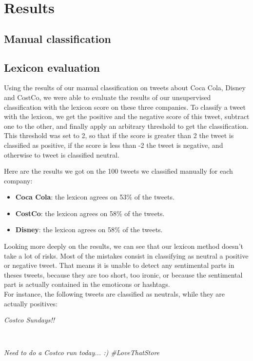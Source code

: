 \documentclass[a4paper,12pt]{report}
\begin{document}
\chapter{Results}

\section{Manual classification}



\section{Lexicon evaluation}

Using the results of our manual classification on tweets about Coca Cola, Disney and CostCo, we were able to evaluate the results of our unsupervised classification with the lexicon score on these three companies.
To classify a tweet with the lexicon, we get the positive and the negative score of this tweet, subtract one to the other, and finally apply an arbitrary threshold to get the classification.
This threshold was set to 2, so that if the score is greater than 2 the tweet is classified as positive, if the score is less than -2 the tweet is negative, and otherwise to tweet is classified neutral.

Here are the results we got on the 100 tweets we classified manually for each company:
\begin{itemize}
        \item \textbf{Coca Cola}: the lexicon agrees on 53\% of the tweets.
        \item \textbf{CostCo}: the lexicon agrees on 58\% of the tweets.
        \item \textbf{Disney}: the lexicon agrees on 58\% of the tweets.
\end{itemize}
Looking more deeply on the results, we can see that our lexicon method doesn't take a lot of risks.
Most of the mistakes consist in classifying as neutral a positive or negative tweet. That means it is unable to detect any sentimental parts in theses tweets, because they are too short, too ironic, or because the sentimental part is actually contained in the emoticons or hashtags.\\
For instance, the following tweets are classified as neutrals, while they are actually positives:\\
\centerline{\textit{Costco Sundays!!}}\\
\centerline{\textit{Need to do a Costco run today... :) \#LoveThatStore}}
\end{document}

